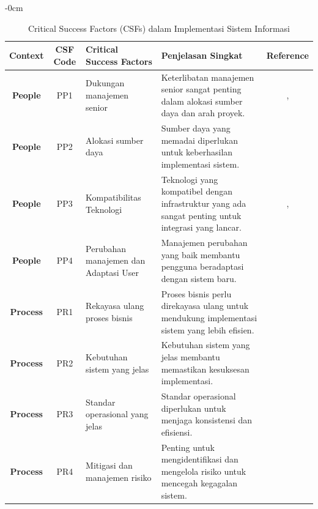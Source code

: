 \documentclass[journal,article,submit,pdftex,moreauthors]{Definitions/mdpi}
\begin{document}
\begin{table}[H]
\begin{adjustwidth}{-\extralength}{0cm}
    \caption{Critical Success Factors (CSFs) dalam Implementasi Sistem Informasi}
    \label{csf-table}
    \centering
    \begin{tabular}{c|c|p{4cm}|p{6cm}|c}
        \toprule
        \textbf{Context} & \textbf{CSF Code} & \textbf{Critical Success Factors} & \textbf{Penjelasan Singkat} & \textbf{Reference} \\ 
        \midrule
        \textbf{People} & PP1 & \raggedright Dukungan manajemen senior & \raggedright Keterlibatan manajemen senior sangat penting dalam alokasi sumber daya dan arah proyek. & \cite{Ghafari-csf}, \cite{falisat-csf} \\ 
        \midrule
        \textbf{People} & PP2 & \raggedright Alokasi sumber daya & \raggedright Sumber daya yang memadai diperlukan untuk keberhasilan implementasi sistem. & \cite{falisat-csf} \\ 
        \midrule
        \textbf{People} & PP3 & \raggedright Kompatibilitas Teknologi & \raggedright Teknologi yang kompatibel dengan infrastruktur yang ada sangat penting untuk integrasi yang lancar. & \cite{salu-csf}, \cite{johny-csf} \\ 
        \midrule
        \textbf{People} & PP4 & \raggedright Perubahan manajemen dan Adaptasi User & \raggedright Manajemen perubahan yang baik membantu pengguna beradaptasi dengan sistem baru. & \cite{Ghafari-csf} \\ 
        \midrule
        \textbf{Process} & PR1 & \raggedright Rekayasa ulang proses bisnis & \raggedright Proses bisnis perlu direkayasa ulang untuk mendukung implementasi sistem yang lebih efisien. & \cite{falisat-csf} \\ 
        \midrule
        \textbf{Process} & PR2 & \raggedright Kebutuhan sistem yang jelas & \raggedright Kebutuhan sistem yang jelas membantu memastikan kesuksesan implementasi. & \cite{johny-csf} \\ 
        \midrule
        \textbf{Process} & PR3 & \raggedright Standar operasional yang jelas & \raggedright Standar operasional diperlukan untuk menjaga konsistensi dan efisiensi. & \cite{salu-csf} \\ 
        \midrule
        \textbf{Process} & PR4 & \raggedright Mitigasi dan manajemen risiko & \raggedright Penting untuk mengidentifikasi dan mengelola risiko untuk mencegah kegagalan sistem. & \cite{falisat-csf} \\ 
        \midrule

\end{tabular}
\end{adjustwidth}
\end{table}
\end{document}
